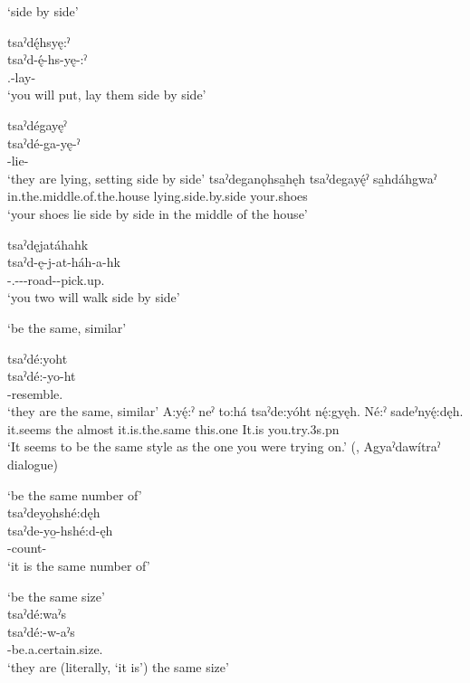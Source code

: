 \ea\label{ex:pppexpressionex20}  ‘side by side’

\ea tsaˀdę́hsyę:ˀ\\
\gll tsaˀd-ę́-hs-yę-:ˀ\\
{\coincident.\dualic}-lay-{\punctual}\\
\glt `you will put, lay them side by side'

\ex tsaˀdégayęˀ\\
\gll tsaˀdé-ga-yę-ˀ\\
{\coincidentdualic}-lie-{\stative}\\
\glt `they are lying, setting side by side'
\ex
\gll tsaˀdeganǫhsa̱hęh tsaˀdegayę́ˀ sa̱hdáhgwaˀ\\
in.the.middle.of.the.house lying.side.by.side your.shoes\\
\glt  ‘your shoes lie side by side in the middle of the house’ 

\ex tsaˀdęjatáhahk\\
\gll tsaˀd-ę-j-at-háh-a-hk\\
{\coincident}-{\dualic}.{\future}--{\semireflexive}-road-{\joinerA}-pick.up.{\zeropunctual}\\
\glt `you two will walk side by side'
\z
\z

\ea\label{ex:pppexpressionex25}  ‘be the same, similar’

\ea tsaˀdé:yoht\\
\gll tsaˀdé:-yo-ht\\
{\coincidentdualic}-resemble.{\stative}\\
\glt `they are the same, similar'
\ex
\gll A:yę́:ˀ neˀ to:há tsaˀde:yóht nę́:gyęh. Né:ˀ sadeˀnyę́:dęh.\\
it.seems the almost it.is.the.same this.one It.is you.try.3s.pn \\
\glt ‘It seems to be the same style as the one you were trying on.’  (\cite[225]{mithun_watewayestanih_1984}, Agyaˀdawítraˀ dialogue)
\z
\z

\newpage
\ea\label{ex:pppexpressionex26}  ‘be the same number of’\\
tsaˀdeyo̱hshé:dęh\\
\gll tsaˀde-yo̱-hshé:d-ęh\\
{\coincidentdualic}-count-{\stative}\\
\glt `it is the same number of'
\z


\ea\label{ex:pppexpressionex27}  ‘be the same size’\\
tsaˀdé:waˀs \\
\gll tsaˀdé:-w-aˀs\\
{\coincidentdualic}-be.a.certain.size.{\stative}\\
\glt ‘they are (literally, `it is’) the same size'
\z


